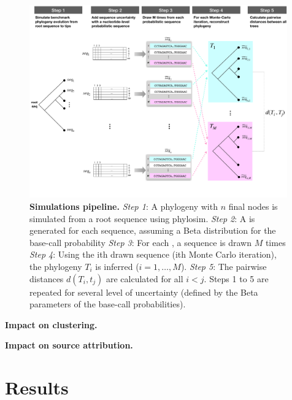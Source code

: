 \documentclass[10pt]{article}
\begin{document}
\begin{figure}[ht]
\centering
    \includegraphics[width=0.99\textwidth]{figs/pipeline.pdf}
\caption{\textbf{Simulations pipeline.} 
\textit{Step 1}: A phylogeny with $n$ final nodes is simulated from a root sequence using \textsf{phylosim}.
\textit{Step 2}: A \nlps is generated for each sequence, assuming a Beta distribution for the base-call probability
\textit{Step 3}: For each \nlps, a sequence is drawn $M$ times
\textit{Step 4}: Using the ith drawn sequence (\ie ith Monte Carlo iteration), the phylogeny $T_i$ is inferred ($i=1,\ldots,M$). 
\textit{Step 5}: The pairwise distances $d(T_i, t_j)$ are calculated for all $i<j$.
Steps 1 to 5 are repeated for several level of uncertainty (defined by the Beta parameters of the base-call probabilities).
}
\label{fig:pipeline}
\end{figure}


\textbf{Impact on clustering.}

\textbf{Impact on source attribution.}






\newpage
\section{Results}

\newpage

\end{document}
